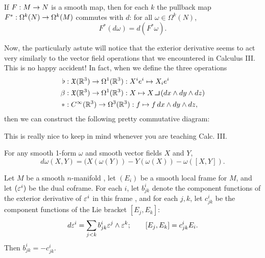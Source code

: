 \setcounter{thm}{25}

\begin{prop}
If $F:M\rightarrow N$ is a smooth map, then for each $k$ the pullback map $F^*:\Omega^k(N)\rightarrow \Omega^k(M)$ commutes with $d$: for all $\omega\in \Omega^k(N)$,
\[F^*(d\omega) = d(F^*\omega).\]
\end{prop}

Now, the particularly astute will notice that the exterior derivative seems to act very similarly to the vector field operations that we encountered in Calculus III. This is no happy accident! In fact, when we define the three operations
\begin{align*}
    \flat &:\fkX(\R^3)\ra \Omega^1(\R^3): X^ie^i \mapsto X_ie^i\\
    \be &: \fkX(\R^3)\ra \Omega^1(\R^3): X \mapsto X\hook (dx\wedge dy\wedge dz)\\
    * &: \Cin(\R^3)\ra \Omega^3(\R^3): f \mapsto f\, dx\wedge dy\wedge dz,
\end{align*}
then we can construct the following pretty commutative diagram:
\begin{center}
\end{center}
This is really nice to keep in mind whenever you are teaching Calc. III.

\setcounter{thm}{28}

\begin{prop}
For any smooth 1-form $\omega$ and smooth vector fields $X$ and $Y$,
\[d\omega(X,Y) = (X(\omega(Y)) - Y(\omega(X)) - \omega([X,Y]).\]
\end{prop}

\begin{prop}
Let $M$ be a smooth $n$-manifold \wowob, let $(E_i)$ be a smooth local frame for $M$, and let $(\varepsilon^i)$ be the dual coframe. For each $i$, let $b^i_{jk}$ denote the component functions of the exterior derivative of $\varepsilon^i$ in this frame , and for each $j,k$, let $c^i_{jk}$ be the component functions of the Lie bracket $[E_j,E_k]$:
\[d\varepsilon^i = \sum_{j < k}b^i_{jk}\varepsilon^j\wedge\varepsilon^k;\qquad [E_j,E_k] = c^i_{jk}E_i.\]
Then $b^i_{jk} = -c^i_{jk}$.
\end{prop}

